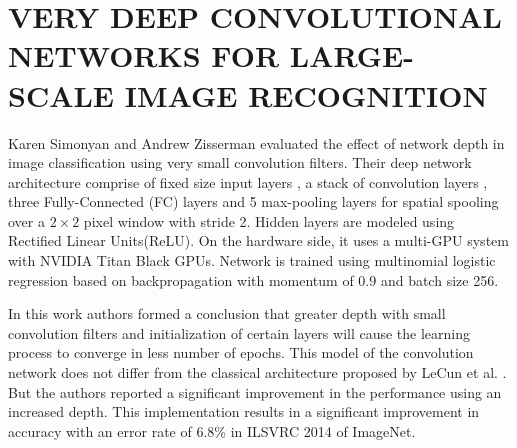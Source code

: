 \documentclass{article}
\begin{document}
\section{VERY DEEP CONVOLUTIONAL NETWORKS FOR LARGE-SCALE IMAGE RECOGNITION}
Karen Simonyan and Andrew Zisserman \cite{Arge2015} evaluated the effect of network depth in image classification using very small convolution filters. Their deep network architecture comprise of fixed  size input layers , a stack of convolution layers , three Fully-Connected (FC) layers and  5 max-pooling layers for spatial spooling  over a $2 \times 2$ pixel window with stride 2. Hidden layers are modeled using Rectified Linear Units(ReLU)\cite{Nair2010}. On the hardware side, it uses a multi-GPU system with NVIDIA Titan Black GPUs. Network is trained using multinomial logistic regression  based on backpropagation with momentum of 0.9 and  batch size  256.
\par
 In this work authors formed a conclusion that greater depth with small convolution filters and  initialization of certain layers will cause the learning process to converge in less number  of epochs. This model of the convolution network does not differ from the classical architecture proposed by  LeCun et  al. \cite{LeCun1998}. But the authors reported a significant improvement in the performance using an increased depth.  This implementation results in a significant improvement in accuracy with  an error rate of  6.8\% in  ILSVRC 2014 of ImageNet.
\end{document}

